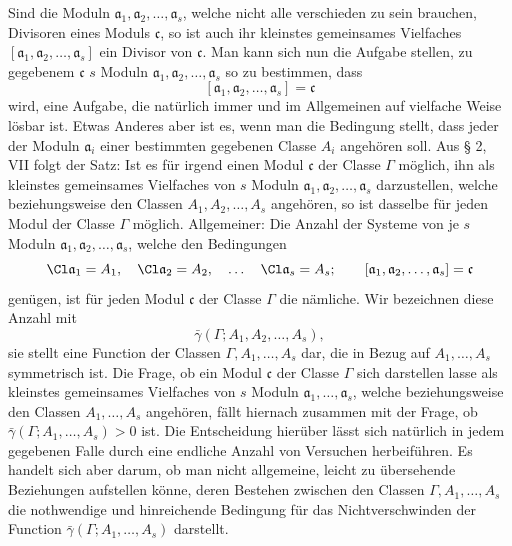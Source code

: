 Sind die Moduln $\mathfrak a_1,\mathfrak a_2,\ldots,\mathfrak a_s$, welche nicht alle verschieden zu sein brauchen, Divisoren eines Moduls $\mathfrak c$, so ist auch ihr kleinstes gemeinsames Vielfaches $[\mathfrak a_1,\mathfrak a_2,\ldots,\mathfrak a_s]$ ein Divisor von $\mathfrak c$. Man kann sich nun die Aufgabe stellen, zu gegebenem $\mathfrak c$ $s$ Moduln $\mathfrak a_1,\mathfrak a_2,\ldots,\mathfrak a_s$ so zu bestimmen, dass
\[
 [\mathfrak a_1,\mathfrak a_2,\ldots,\mathfrak a_s]=\mathfrak c
\]
wird, eine Aufgabe, die natürlich immer und im Allgemeinen auf vielfache Weise lösbar ist. Etwas Anderes aber ist es, wenn man die Bedingung stellt, dass jeder der Moduln $\mathfrak a_i$ einer bestimmten gegebenen Classe $A_i$ angehören soll. Aus § 2, VII folgt der Satz: Ist es für irgend einen Modul $\mathfrak c$ der Classe $\Gamma$ möglich, ihn als kleinstes gemeinsames Vielfaches von $s$ Moduln $\mathfrak a_1,\mathfrak a_2,\ldots,\mathfrak a_s$ darzustellen, welche beziehungsweise den Classen $A_1,A_2,\ldots,A_s$ angehören, so ist dasselbe für jeden Modul der Classe $\Gamma$ möglich. Allgemeiner: Die Anzahl der Systeme von je $s$ Moduln $\mathfrak a_1,\mathfrak a_2,\ldots,\mathfrak a_s$, welche den Bedingungen
\[
 \Cl\mathfrak a_1=A_1,
 \quad
 \Cl\mathfrak a_2=A_2,
 \quad\ldots\quad
 \Cl\mathfrak a_s=A_s;
 \qquad
 [\mathfrak a_1,\mathfrak a_2,\ldots,\mathfrak a_s]=\mathfrak c
\]
genügen, ist für jeden Modul $\mathfrak c$ der Classe $\Gamma$ die nämliche. Wir bezeichnen diese Anzahl mit
\[
 \bar\gamma(\Gamma;A_1,A_2,\ldots,A_s),
\]
sie stellt eine Function der Classen $\Gamma,A_1,\ldots,A_s$ dar, die in Bezug auf $A_1,\ldots,A_s$ symmetrisch ist. Die Frage, ob ein Modul $\mathfrak c$ der Classe $\Gamma$ sich darstellen lasse als kleinstes gemeinsames Vielfaches von $s$ Moduln $\mathfrak a_1,\ldots,\mathfrak a_s$, welche beziehungsweise den Classen $A_1,\ldots,A_s$ angehören, fällt hiernach zusammen mit der Frage, ob $\bar\gamma(\Gamma;A_1,\ldots,A_s)>0$ ist. Die Entscheidung hierüber lässt sich natürlich in jedem gegebenen Falle durch eine endliche Anzahl von Versuchen herbeiführen. Es handelt sich aber darum, ob man nicht allgemeine, leicht zu übersehende Beziehungen aufstellen könne, deren Bestehen zwischen den Classen $\Gamma,A_1,\ldots,A_s$ die nothwendige und hinreichende Bedingung für das Nichtverschwinden der Function $\bar\gamma(\Gamma;A_1,\ldots,A_s)$ darstellt.

